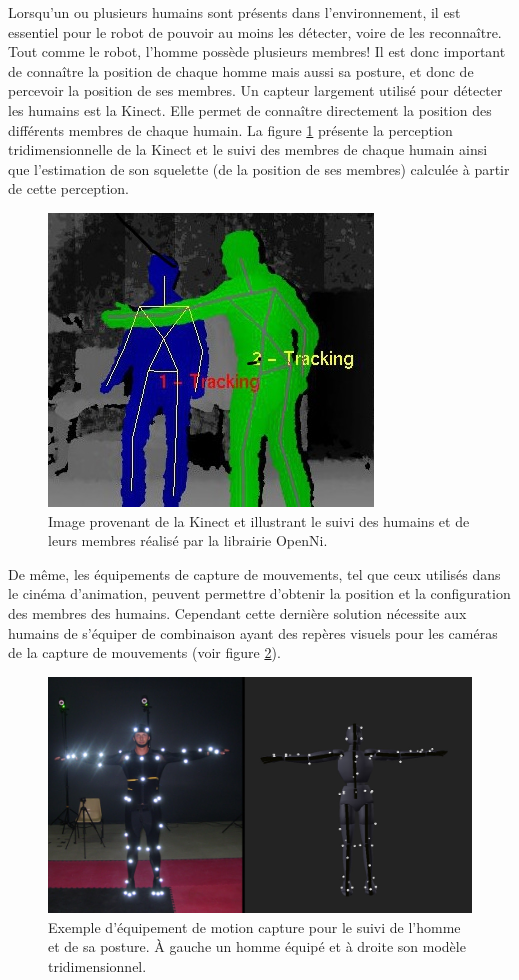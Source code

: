 \documentclass[a4paper,11pt,twoside]{StyleThese}
\begin{document}
Lorsqu'un ou plusieurs humains sont présents dans l'environnement, il est essentiel pour le robot de pouvoir au moins les détecter, voire de les reconnaître.
Tout comme le robot, l'homme possède plusieurs membres! Il est donc important de connaître la position de chaque homme mais aussi sa posture, et donc de percevoir la position de ses membres. Un capteur largement utilisé pour détecter les humains est la Kinect. Elle permet de connaître directement la position des différents membres de chaque humain. La figure \ref{fig:skeleton} présente la perception tridimensionnelle de la Kinect et le suivi des membres de chaque humain ainsi que l'estimation de son squelette (de la position de ses membres) calculée à partir de cette perception.

\begin{figure}[ht!]
 \centering
  \includegraphics[width=0.59\linewidth]{./img/skeleton3.jpg} 
  \caption {Image provenant de la Kinect et illustrant le suivi des humains et de leurs membres réalisé par la librairie OpenNi.}
  \label{fig:skeleton}
\end{figure}


De même, les équipements de capture de mouvements, tel que ceux utilisés dans le cinéma d'animation, peuvent permettre d'obtenir la position et la configuration des membres des humains. Cependant cette dernière solution nécessite aux humains de s'équiper de combinaison ayant des repères visuels pour les caméras de la capture de mouvements (voir figure \ref{fig:mocap}).

\begin{figure}[ht!]
 \centering
  \includegraphics[width=0.69\linewidth]{./img/motionCap.jpg} 
  \caption {Exemple d'équipement de motion capture pour le suivi de l'homme et de sa posture. À gauche un homme équipé et à droite son modèle tridimensionnel.}
  \label{fig:mocap}
\end{figure}
\end{document}
